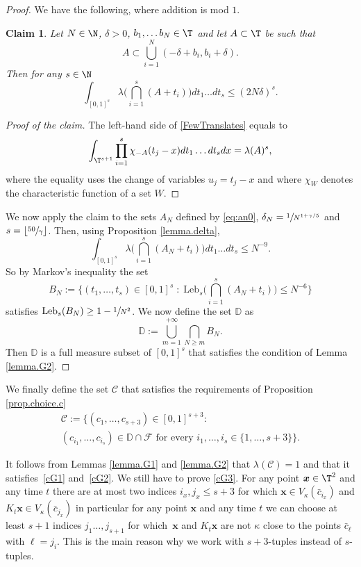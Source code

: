 \documentclass[10pt]{amsart}
\let\DS\relax
\let\ts\textstyle
\newcommand\cC{\mathcal{C}}
\newcommand\cF{\mathcal{F}}
\newcommand\bx{\boldsymbol{x}}
\newcommand\Leb{\mathrm{Leb}}
\theoremstyle{definition}
\theoremstyle{plain}
\newtheorem*{claim}{Claim}
\begin{document}
\begin{proof}
We have the following, where addition is mod $1$.

\begin{claim}
Let $N\in \N$, $\delta>0$, $b_1,\ldots b_N\in \T$ and let $A\subset \T$ be such that
\[
A\subset \bigcup_{i=1}^N(-\delta+b_i,b_i+\delta).
\]
Then for any $s\in \N$
\begin{equation}
\label{FewTranslates}
\int_{[0,1]^s}\lambda\Big( \bigcap_{i=1}^s(A+t_i)\Big)dt_1\ldots dt_s{\leq} (2N\delta)^{s}.
\end{equation}
\end{claim}

\begin{proof}[Proof of the claim]
The left-hand side of \eqref{FewTranslates}
equals to
\[
\int_{\T^{s+1}} \prod_{i=1}^s \chi_{-A} (t_j-x) dt_1\dots dt_s dx=\lambda(A)^s,
\]
where the equality uses the change of variables $u_j=t_j-x$ and where $\chi_W$ denotes the characteristic function of a set $W$.
\end{proof}
We now apply the claim to the sets $A_N$ defined by \eqref{eq:an0}, $\delta_N=\sfrac{1}{N^{1+\gamma/5}}$ and $s=\lfloor \sfrac{50}{\gamma} \rfloor$. Then, using Proposition \ref{lemma.delta},
\[
\int_{[0,1]^s}\lambda\Big(\bigcap_{i=1}^s(A_N+t_i)\Big)dt_1\ldots dt_s\leq N^{-9}.
\]
So by Markov's inequality the set
\[
B_N:=\Big\{(t_1,\ldots,t_s)\in [0,1]^s\;:\; \Leb_s\Big(\ts\bigcap_{i=1}^s(A_N+t_i)\Big)\leq N^{-6}\Big\}
\]
satisfies
$\DS
\Leb_s(B_N)\geq 1-\sfrac{1}{N^2}$.
We now define the set $\mathbb{D}$ as
\[
\mathbb{D}:=\bigcup_{m=1}^{+\infty} \bigcap_{N\geq m}B_N.
\]
Then $\mathbb{D}$ is a full measure subset of $[0,1]^s$ that satisfies the condition of Lemma \ref{lemma.G2}.
\end{proof}

We finally define the set $\cC$ that satisfies the requirements of
Proposition \ref{prop.choice.c}
\begin{multline*}%
\cC:=\Big\{(c_1,\ldots,c_{s+3})\in [0,1]^{s+3}:\\
(c_{i_1},\ldots,c_{i_s})\in \mathbb{D} \cap \cF \text{ for every } i_1,\ldots,i_s\in \{1,\ldots, s+3\}\Big\}.
\end{multline*}

It follows from Lemmas \ref{lemma.G1} and \ref{lemma.G2} that $\lambda(\cC)=1$ and that it satisfies~\eqref{cG1} and~\eqref{cG2}. We still have to prove \eqref{cG3}. { For any point $\bx\in \T^2$ and any time $t$ there are at most two indices $i_x,j_x\leq s+3$ for which $\bx\in V_{\kappa}(\bar{c}_{i_x})$ and $K_t\bx\in V_{\kappa}(\bar{c}_{j_x})$ in particular for any point $ \bx$ and any time $t$ we can choose at least $s+1$ indices $j_1\ldots, j_{s+1}$ for which~$\bx$ and $K_t \bx$ are not $\kappa$ close to the points $\bar{c}_\ell$ with $\ell=j_i$. This is the main reason why we work with $s+3$-tuples instead of $s$-tuples.}
\end{document}
